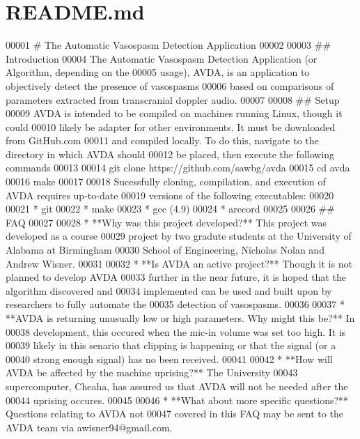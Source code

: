 \hypertarget{README_8md_source}{\section{R\+E\+A\+D\+M\+E.\+md}
}

\begin{DoxyCode}
00001 # The Automatic Vasospasm Detection Application
00002 
00003 ## Introduction
00004 The Automatic Vasospasm Detection Application (or Algorithm, depending on the
00005 usage), AVDA, is an application to objectively detect the presence of vasospasms
00006 based on comparisons of parameters extracted from transcranial doppler audio.
00007 
00008 ## Setup
00009 AVDA is intended to be compiled on machines running Linux, though it could
00010 likely be adapter for other environments. It must be downloaded from GitHub.com
00011 and compiled locally. To do this, navigate to the directory in which AVDA should
00012 be placed, then execute the following commands
00013 
00014    git clone https://github.com/sawbg/avda
00015    cd avda
00016    make
00017 
00018 Sucessfully cloning, compilation, and execution of AVDA requires up-to-date
00019 versions of the following executables:
00020 
00021 * git
00022 * make
00023 * gcc (4.9)
00024 * arecord
00025 
00026 ## FAQ
00027 
00028 * **Why was this project developed?** This project was developed as a course 
00029 project by two gradute students at the University of Alabama at Birmingham
00030 School of Engineering, Nicholas Nolan and Andrew Wisner.
00031 
00032 * **Is AVDA an active project?** Though it is not planned to develop AVDA
00033 further in the near future, it is hoped that the algorithm discovered and
00034 implemented can be used and built upon by researchers to fully automate the
00035 detection of vasospasms.
00036 
00037 * **AVDA is returning unusually low or high parameters. Why might this be?** In
00038   development, this occured when the mic-in volume was set too high. It is
00039 likely in this senario that clipping is happening or that the signal (or a
00040 strong enough signal) has no been received.
00041 
00042 * **How will AVDA be affected by the machine uprising?** The University
00043   supercomputer, Cheaha, has assured us that AVDA will not be needed after the
00044 uprising occures.
00045 
00046 * **What about more specific questions?** Questions relating to AVDA not
00047 covered in this FAQ may be sent to the AVDA team via awisner94@gmail.com.
\end{DoxyCode}
